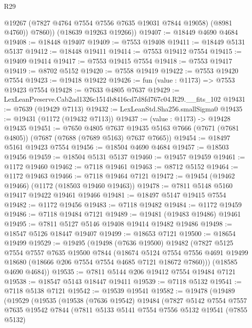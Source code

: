 \begin{lexlean}{R29}
\begin{coremodule}
            @19267
            (@7827 @4764 @7554 @7556 @7635 @19031 @7844 @19058)
            (@8981 @4760))
          @7860))
      (@18639 @19263 @19266))
@19407 := @18449 @4690 @4684
@19408 := @18448 @19407
@19409 := @7553 @19408
@19411 := @18449 @5131 @5137
@19412 := @18448 @19411
@19414 := @7553 @19412 @7554
@19415 := @19409 @19414
@19417 := @7553 @19415 @7554
@19418 := @7553 @19417
@19419 := @8702 @5152
@19420 := @7558 @19419
@19422 := @7553 @19420 @7554
@19423 := @19418 @19422
@19426 := fun (value : @1173) => @7553 @19423 @7554
@19428 := @7633 @4805 @7637
@19429 := LexLeanPreserve.Cab2ad1326c1514b8416cd7d8fd767c04.R29.__fits_102
@19431 := @7639 (@19429 @7113)
@19432 := LexLeanStd.Sha256.smallSigma0
@19435 := @19431 (@1172 (@19432 @7113))
@19437 := (value : @1173) -> @19428 @19435
@19451 := @7650
    @4805
    @7637
    @19435
    @5163
    @7666
    (@7671 (@7681 @4805))
    (@7687 (@7688 (@7689 @5163) @7637 @7665))
@19454 := @18497 @5161 @19423 @7554
@19456 := @18504 @4690 @4684
@19457 := @18503 @19456
@19459 := @18504 @5131 @5137
@19460 := @19457 @19459
@19461 := @1172 @19460
@19462 := @7118 @19461
@19463 := @8712 @5152
@19464 := @1172 @19463
@19466 := @7118 @19464 @7121
@19472 := @19454 (@19462 @19466) (@1172 (@18503 @19460 @19463))
@19478 := @7811 @5148 @5160 @19417 @19422 @19461 @19466
@19481 := @18497 @5147 @19415 @7554
@19482 := @1172 @19456
@19483 := @7118 @19482
@19484 := @1172 @19459
@19486 := @7118 @19484 @7121
@19489 := @19481 (@19483 @19486) @19461
@19495 := @7811 @5127 @5146 @19408 @19414 @19482 @19486
@19498 := @18547 @5126 @18447 @19407
@19499 := @18653 @7121
@19500 := @18654 @19499
@19529 := @19495
    (@19498
      (@7636 @19500)
      @19482
      (@7827
        @5125
        @7554
        @7557
        @7635
        @19500
        @7844
        (@18674
          @5124
          @7554
          @7556
          @4691
          @19499
          @18680
          (@18666 @206 @7554 @7554 @4685 @7121 @18672 @7860)))
      (@18585 @4690 @4684))
@19535 := @7811 @5144 @206 @19412 @7554 @19484 @7121
@19538 := @18547 @5143 @18447 @19411
@19539 := @7118 @5132
@19541 := @7118 @5138 @7121
@19542 := @19539 @19541
@19582 := @19478
    (@19489
      (@19529
        (@19535
          (@19538
            (@7636 @19542)
            @19484
            (@7827
              @5142
              @7554
              @7557
              @7635
              @19542
              @7844
              (@7811
                @5133
                @5141
                @7554
                @7556
                @5132
                @19541
                (@7855 @5132)

\end{coremodule}
\end{lexlean}
